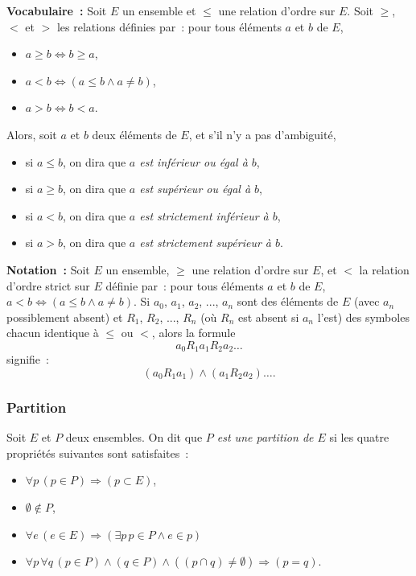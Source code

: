 \noindent\textbf{Vocabulaire :} Soit $E$ un ensemble et $\leq$ une relation d'ordre sur $E$. 
    Soit $\geq$, $<$ et $>$ les relations définies par : pour tous éléments $a$ et $b$ de $E$, 
    \begin{itemize}[nosep]
        \item $a \geq b \Leftrightarrow b \geq a$,
        \item $a < b \Leftrightarrow ( a \leq b \wedge a \neq b )$,
        \item $a > b \Leftrightarrow b < a$.
    \end{itemize}
    Alors, soit $a$ et $b$ deux éléments de $E$, et s'il n'y a pas d'ambiguité, 
    \begin{itemize}[nosep]
        \item si $a \leq b$, on dira que \textit{$a$ est inférieur ou égal à $b$}, 
        \item si $a \geq b$, on dira que \textit{$a$ est supérieur ou égal à $b$}, 
        \item si $a < b$, on dira que \textit{$a$ est strictement inférieur à $b$}, 
        \item si $a > b$, on dira que \textit{$a$ est strictement supérieur à $b$}.
    \end{itemize}

\medskip

\noindent\textbf{Notation :} Soit $E$ un ensemble, $\geq$ une relation d'ordre sur $E$, et $<$ la relation d'ordre strict sur $E$ définie par : pour tous éléments $a$ et $b$ de $E$, $a < b \Leftrightarrow ( a \leq b \wedge a \neq b )$. 
    Si $a_0$, $a_1$, $a_2$, ..., $a_n$ sont des éléments de $E$ (avec $a_n$ possiblement absent) et $R_1$, $R_2$, ..., $R_n$ (où $R_n$ est absent si $a_n$ l'est) des symboles chacun identique à $\leq$ ou $<$, alors la formule
    \begin{equation*}
        a_0 \mathrel{R_1} a_1 \mathrel{R_2} a_2 \dots
    \end{equation*}
    signifie :
    \begin{equation*}
        (a_0 \mathrel{R_1} a_1) \wedge (a_1 \mathrel{R_2} a_2) \dots .
    \end{equation*}

\subsubsection{Partition} 

Soit $E$ et $P$ deux ensembles. 
On dit que \textit{$P$ est une partition de $E$} si les quatre propriétés suivantes sont satisfaites : 
\begin{itemize}[nosep]
    \item $\forall p \, (p \in P) \Rightarrow (p \subset E)$, 
    \item $\emptyset \notin P$, 
    \item $\forall e \, (e \in E) \Rightarrow (\exists p \, p \in P \wedge e \in p)$
    \item $\forall p \, \forall q \, (p \in P) \wedge (q \in P) \wedge ((p \cap q) \neq \emptyset) \Rightarrow (p = q)$. 
\end{itemize}

